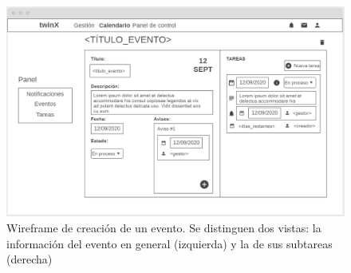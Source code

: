 \begin{figure}
	\centering
	\includegraphics[width=\textwidth]{img/Wireframes/Calendario/nuevo_evento.png}
	\caption[Wireframe de creación de un evento]{Wireframe de creación de un evento. Se distinguen dos vistas: la información del evento en general (izquierda) y la de sus subtareas (derecha)}
	\label{fig:nuevo_eventoWF}
\end{figure}




